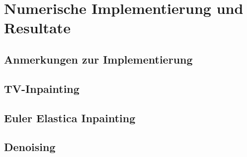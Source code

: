 \documentclass{mythesis}
\begin{document}


\chapter{Numerische Implementierung und Resultate}



\section{Anmerkungen zur Implementierung}

\section{TV-Inpainting}

\section{Euler Elastica Inpainting}

\section{Denoising}


\end{document}
